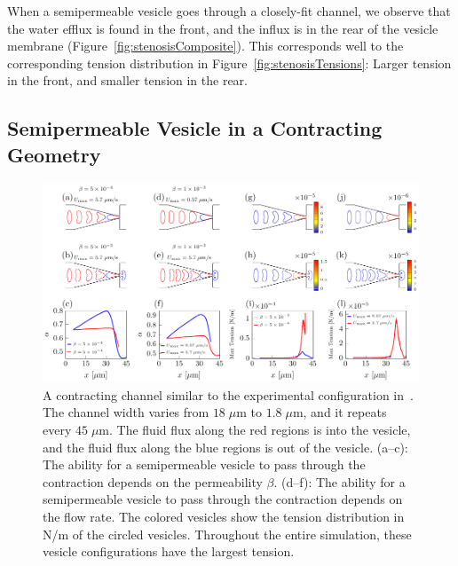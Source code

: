 \documentclass[prb,preprint,showpacs,preprintnumbers,amsmath,amssymb,longbibliography]{revtex4-1}
\newif\ifTikz
\begin{document}
When a semipermeable vesicle goes through a closely-fit channel, we observe that the water efflux is found in the front, and the influx is in the rear of the vesicle membrane (Figure~\ref{fig:stenosisComposite}). This corresponds well to the corresponding tension distribution in Figure~\ref{fig:stenosisTensions}: Larger tension in the front, and smaller tension in the rear.

\subsection{Semipermeable Vesicle in a Contracting Geometry} 
\begin{figure}[htp]
  \centering
    \centering
  \ifTikz
  
  \else
  \includegraphics{figures/contractingComposite.pdf}
  \fi
  \caption{\label{fig:contractingComposite} A contracting channel
  similar to the experimental configuration in~\cite{wu2015critical}.
  The channel width varies from $18\;\mu$m to $1.8\;\mu$m, and it
  repeats every $45\;\mu$m. The fluid flux along the red regions is into
  the vesicle, and the fluid flux along the blue regions is out of the
  vesicle.  (a--c): The ability for a semipermeable vesicle to pass
  through the contraction depends on the permeability $\beta$. (d--f):
  The ability for a semipermeable vesicle to pass through the
  contraction depends on the flow rate. The colored vesicles show the
  tension distribution in N/m of the circled vesicles. Throughout the
  entire simulation, these vesicle configurations have the largest
  tension.}
\end{figure}
\end{document}

